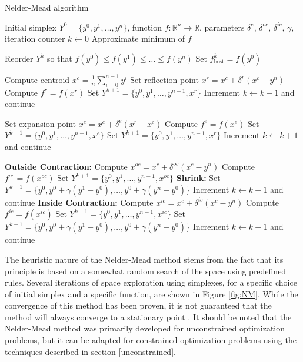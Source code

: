 \begin{algorithm}
	\caption{Nelder-Mead algorithm}\label{neldermead}
	\begin{algorithmic}[1]
		\Require Initial simplex $Y^0 = \{y^0, y^1, \dots, y^n\}$, function $f: \mathbb{R}^n \to \mathbb{R}$, parameters $\delta^e$, $\delta^{oc}$, $\delta^{ic}$, $\gamma$, iteration counter $k \gets 0$
		\Ensure Approximate minimum of $f$
		
		\State Reorder $Y^k$ so that $f(y^0) \leq f(y^1) \leq \dots \leq f(y^n)$
		\State Set $f^k_{\text{best}} = f(y^0)$
		
		\State Compute centroid $x^c = \frac{1}{n} \sum_{i=0}^{n-1} y^i$
		\State Set reflection point $x^r = x^c + \delta^r (x^c - y^n)$
		\State Compute $f^r = f(x^r)$
		\State Set $Y^{k+1} = \{y^0, y^1, \dots, y^{n-1}, x^r\}$
		\State Increment $k \gets k+1$ and continue
		\EndIf
		
		\State Set expansion point $x^e = x^c + \delta^e (x^r - x^c)$
		\State Compute $f^e = f(x^e)$
		\State Set $Y^{k+1} = \{y^0, y^1, \dots, y^{n-1}, x^e\}$
		\Else
		\State Set $Y^{k+1} = \{y^0, y^1, \dots, y^{n-1}, x^r\}$
		\EndIf
		\State Increment $k \gets k+1$ and continue
		\EndIf
		
		\State \textbf{Outside Contraction:} Compute $x^{oc} = x^c + \delta^{oc}(x^c - y^n)$
		\State Compute $f^{oc} = f(x^{oc})$
		\State Set $Y^{k+1} = \{y^0, y^1, \dots, y^{n-1}, x^{oc}\}$
		\Else
		\State \textbf{Shrink:} Set $Y^{k+1} = \{y^0, y^0 + \gamma(y^1 - y^0), \dots, y^0 + \gamma(y^n - y^0)\}$
		\EndIf
		\State Increment $k \gets k+1$ and continue
		\Else
		\State \textbf{Inside Contraction:} Compute $x^{ic} = x^c + \delta^{ic}(x^c - y^n)$
		\State Compute $f^{ic} = f(x^{ic})$
		\State Set $Y^{k+1} = \{y^0, y^1, \dots, y^{n-1}, x^{ic}\}$
		\Else
		\State Set $Y^{k+1} = \{y^0, y^0 + \gamma(y^1 - y^0), \dots, y^0 + \gamma(y^n - y^0)\}$
		\EndIf
		\State Increment $k \gets k+1$ and continue
		\EndIf
		\EndWhile
		\EndProcedure
	\end{algorithmic}
\end{algorithm}


The heuristic nature of the Nelder-Mead method stems from the fact that its principle is based on a somewhat random search of the space using predefined rules. Several iterations of space exploration using simplexes, for a specific choice of initial simplex and a specific function, are shown in Figure \ref{fig:NM}. While the convergence of this method has been proven, it is not guaranteed that the method will always converge to a stationary point \cite{BBO-textbook}. It should be noted that the Nelder-Mead method was primarily developed for unconstrained optimization problems, but it can be adapted for constrained optimization problems using the techniques described in section \ref{unconstrained}.


